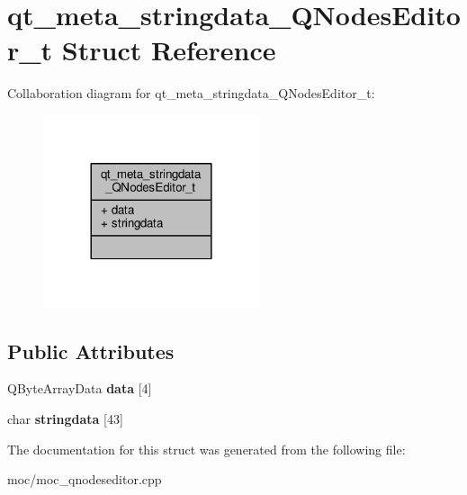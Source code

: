 \hypertarget{structqt__meta__stringdata___q_nodes_editor__t}{\section{qt\-\_\-meta\-\_\-stringdata\-\_\-\-Q\-Nodes\-Editor\-\_\-t Struct Reference}
\label{structqt__meta__stringdata___q_nodes_editor__t}
}


Collaboration diagram for qt\-\_\-meta\-\_\-stringdata\-\_\-\-Q\-Nodes\-Editor\-\_\-t\-:
\nopagebreak
\begin{figure}[H]
\begin{center}
\leavevmode
\includegraphics[width=180pt]{structqt__meta__stringdata___q_nodes_editor__t__coll__graph}
\end{center}
\end{figure}
\subsection*{Public Attributes}
\begin{DoxyCompactItemize}
\item 
\hypertarget{structqt__meta__stringdata___q_nodes_editor__t_a7cb67e4162966abc3f7465d8c477c0a3}{Q\-Byte\-Array\-Data {\bfseries data} \mbox{[}4\mbox{]}}\label{structqt__meta__stringdata___q_nodes_editor__t_a7cb67e4162966abc3f7465d8c477c0a3}

\item 
\hypertarget{structqt__meta__stringdata___q_nodes_editor__t_a08c793c8d68f4f57ab65a85514288d5f}{char {\bfseries stringdata} \mbox{[}43\mbox{]}}\label{structqt__meta__stringdata___q_nodes_editor__t_a08c793c8d68f4f57ab65a85514288d5f}

\end{DoxyCompactItemize}


The documentation for this struct was generated from the following file\-:\begin{DoxyCompactItemize}
\item 
moc/moc\-\_\-qnodeseditor.\-cpp\end{DoxyCompactItemize}
